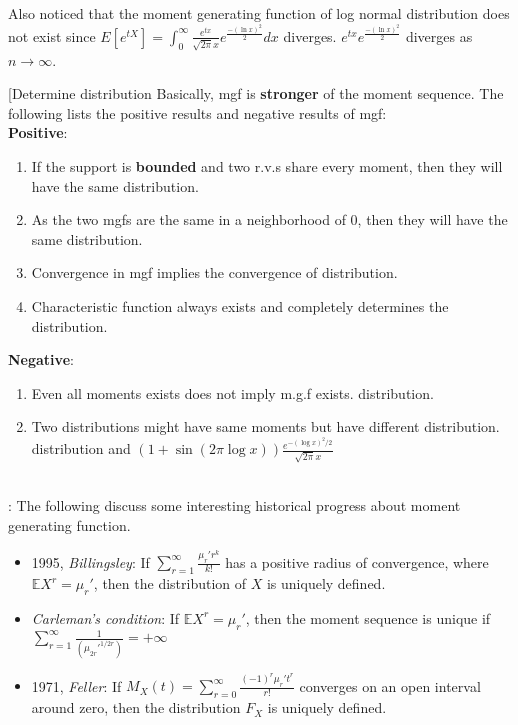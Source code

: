 \documentclass[../Transformation.tex]{subfiles}
\begin{document}
\begin{remark}
Also noticed that the moment generating function of log normal distribution does not exist since $E[e^{tX}]=\int_0^\infty\frac{e^{tx}}{\sqrt{2\pi}x}e^{\frac{-(\ln x)^2}{2}}dx$ diverges. $e^{tx}e^{\frac{-(\ln x)^2}{2}}$ diverges as $n\rightarrow\infty$.
\end{remark}

\begin{conclusion}[Determine distribution
	Basically, mgf is {\bf stronger} of the moment sequence. The following lists the positive results and negative results of mgf:\\
	{\bf Positive}:
	\begin{enumerate}
		\item If the support is {\bf bounded} and two r.v.s share every moment, then they will have the same distribution.
		\item As the two mgfs are the same in a neighborhood of 0, then they will have the same distribution.
		\item Convergence in mgf implies the convergence of distribution.
		\item Characteristic function always exists and completely determines the distribution.
	\end{enumerate}
	{\bf Negative}:
	\begin{enumerate}
		\item Even all moments exists does not imply m.g.f exists.  distribution.
		\item Two distributions might have same moments but have different distribution.  distribution and $(1+\sin(2\pi\log x))\frac{e^{-(\log x)^2/2}}{\sqrt{2\pi}x}$
	\end{enumerate}
\end{conclusion}

\mbox{}\\
: The following discuss some interesting historical progress about moment generating function.
\begin{itemize}
	\item 1995, {\it Billingsley}: If $\sum_{r=1}^{\infty}\frac{\mu_r' r^k}{k!}$ has a positive radius of convergence, where $\mathbb{E}X^r = \mu_r'$, then the distribution of $X$ is uniquely defined.
	\item {\it Carleman's condition}: If $\mathbb{E}X^r = \mu_r'$, then the moment sequence is unique if $\sum_{r=1}^{\infty}\frac{1}{(\mu_{2r}'^{1/2r})}=+\infty$
	\item 1971, {\it Feller}: If $M_X(t) = \sum_{r=0}^{\infty}\frac{(-1)^r\mu_r' t^r}{r!}$ converges on an open interval around zero, then the distribution $F_X$ is uniquely defined.
\end{itemize}
\end{document}
